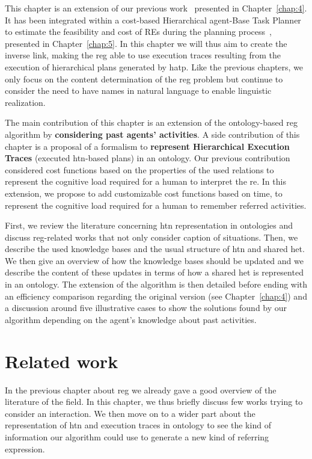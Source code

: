 This chapter is an extension of our previous work~\cite{buisan_2020_efficient} presented in Chapter~\ref{chap:4}. It has been integrated within a cost-based Hierarchical agent-Base Task Planner to estimate the feasibility and cost of REs during the planning process~\cite{buisan_2020_human}, presented in Chapter~\ref{chap:5}. In this chapter we will thus aim to create the inverse link, making the \acrshort{reg} able to use execution traces resulting from the execution of hierarchical plans generated by \acrshort{hatp}. Like the previous chapters, we only focus on the content determination of the \acrshort{reg} problem but continue to consider the need to have names in natural language to enable linguistic realization.

The main contribution of this chapter is an extension of the ontology-based \acrshort{reg} algorithm by \textbf{considering past agents' activities}. A side contribution of this chapter is a proposal of a formalism to \textbf{represent Hierarchical Execution Traces} (executed \acrshort{htn}-based plans) in an ontology. Our previous contribution considered cost functions based on the properties of the used relations to represent the cognitive load required for a human to interpret the \acrshort{re}. In this extension, we propose to add customizable cost functions based on time, to represent the cognitive load required for a human to remember referred activities.

First, we review the literature concerning \acrshort{htn} representation in ontologies and discuss \acrshort{reg}-related works that not only consider caption of situations. Then, we describe the used knowledge bases and the usual structure of \acrshort{htn} and shared \acrfull{het}. We then give an overview of how the knowledge bases should be updated and we describe the content of these updates in terms of how a shared \acrfull{het} is represented in an ontology. The extension of the algorithm is then detailed before ending with an efficiency comparison regarding the original version (see Chapter~\ref{chap:4}) and a discussion around five illustrative cases to show the solutions found by our algorithm depending on the agent's knowledge about past activities.

\section{Related work}

In the previous chapter about \acrlong{reg} we already gave a good overview of the literature of the field. In this chapter, we thus briefly discuss few works trying to consider an interaction. We then move on to a wider part about the representation of \acrshort{htn} and execution traces in ontology to see the kind of information our algorithm could use to generate a new kind of referring expression.

